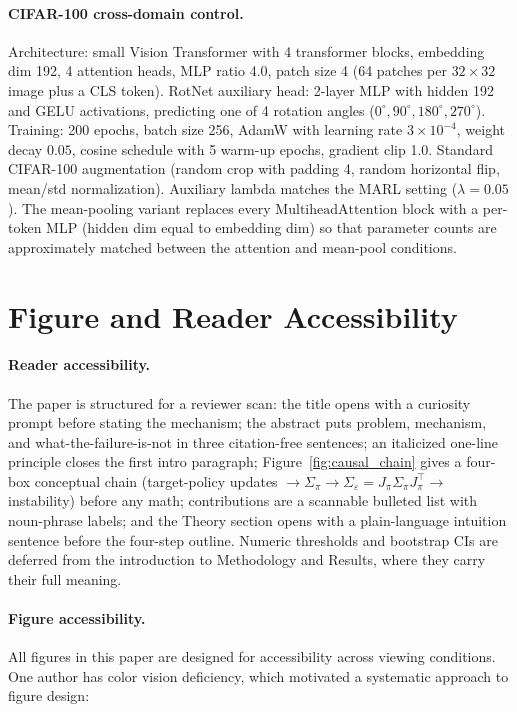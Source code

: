 \documentclass{article}
\theoremstyle{plain}
\theoremstyle{definition}
\theoremstyle{remark}
\begin{document}
\paragraph{CIFAR-100 cross-domain control.}
Architecture: small Vision Transformer with 4 transformer blocks,
embedding dim 192, 4 attention heads, MLP ratio 4.0, patch size 4
(64 patches per $32{\times}32$ image plus a CLS token). RotNet
auxiliary head: 2-layer MLP with hidden 192 and GELU activations,
predicting one of 4 rotation angles ($0^\circ, 90^\circ, 180^\circ, 270^\circ$).
Training: 200 epochs, batch size 256, AdamW with learning rate
$3 \times 10^{-4}$, weight decay $0.05$, cosine schedule with 5
warm-up epochs, gradient clip 1.0. Standard CIFAR-100 augmentation
(random crop with padding 4, random horizontal flip, mean/std
normalization). Auxiliary lambda matches the MARL setting
($\lambda = 0.05$). The mean-pooling variant replaces every
$\mathrm{MultiheadAttention}$ block with a per-token MLP (hidden
dim equal to embedding dim) so that parameter counts are
approximately matched between the attention and mean-pool conditions.


\section{Figure and Reader Accessibility}
\label{app:accessibility}

\paragraph{Reader accessibility.}
The paper is structured for a reviewer scan: the title
opens with a curiosity prompt before stating the mechanism; the
abstract puts problem, mechanism, and what-the-failure-is-not in
three citation-free sentences; an italicized one-line principle
closes the first intro paragraph; Figure~\ref{fig:causal_chain}
gives a four-box conceptual chain (target-policy updates $\to
\Sigma_\pi \to \Sigma_\varepsilon = J_\pi \Sigma_\pi J_\pi^\top \to$
instability) before any math;
contributions are a scannable bulleted list with noun-phrase labels;
and the Theory section opens with a plain-language intuition
sentence before the four-step outline. Numeric thresholds and
bootstrap CIs are deferred from the introduction to Methodology and
Results, where they carry their full meaning.

\paragraph{Figure accessibility.}
All figures in this paper are designed for accessibility across viewing
conditions. One author has color vision deficiency, which motivated a
systematic approach to figure design:
\end{document}
